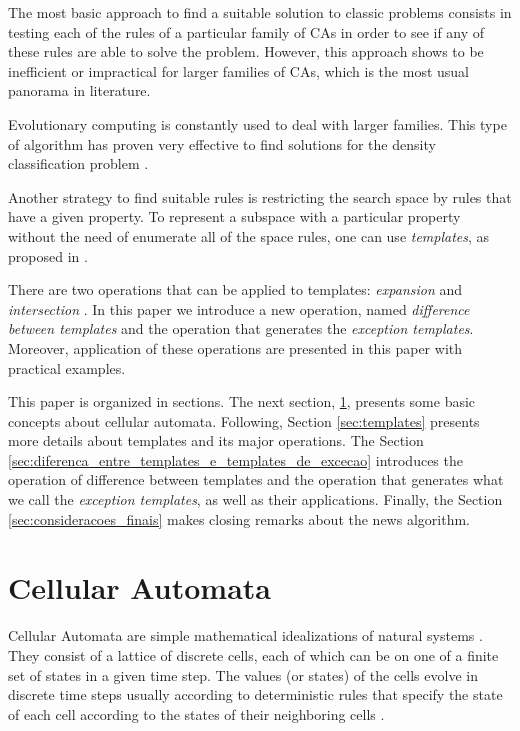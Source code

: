 \documentclass{llncs}
\begin{document}
The most basic approach to find a suitable solution to classic problems consists in testing each of the rules of a particular family of CAs in order to see if any of these rules are able to solve the problem. However, this approach shows to be inefficient or impractical for larger families of CAs, which is the most usual panorama in literature.

Evolutionary computing is constantly used to deal with larger families. This type of algorithm has proven very effective to find solutions for the density classification problem \cite{wolz2008very}.

Another strategy to find suitable rules is restricting the search space by rules that have a given property. To represent a subspace with a particular property without the need of enumerate all of the space rules, one can use \textit{templates}, as proposed in \cite{deOliveira2014,deOliveira2014b}.

There are two operations that can be applied to templates: \textit{expansion} and \textit{intersection} \cite{deOliveira2014,deOliveira2014b}. In this paper we introduce a new operation, named \textit{difference between templates} and the operation that generates the \textit{exception templates}. Moreover, application of these operations are presented in this paper with practical examples.

This paper is organized in sections. The next section, \ref{sec:automatos_celulares}, presents some basic concepts about cellular automata. Following, Section \ref{sec:templates} presents more details about templates and its major operations. The Section \ref{sec:diferenca_entre_templates_e_templates_de_excecao} introduces the operation of difference between templates and the operation that generates what we call the \textit{exception templates}, as well as their applications. Finally, the Section \ref{sec:consideracoes_finais} makes closing remarks about the news algorithm.

\section{Cellular Automata}
\label{sec:automatos_celulares}
Cellular Automata are simple mathematical idealizations of natural systems \cite{wolfram1994cellular}. They consist of a lattice of discrete cells, each of which can be on one of a finite set of states in a given time step. The values (or states) of the cells evolve in discrete time steps usually according to deterministic rules that specify the state of each cell according to the states of their neighboring cells \cite{wolfram1994cellular}.%
\end{document}

